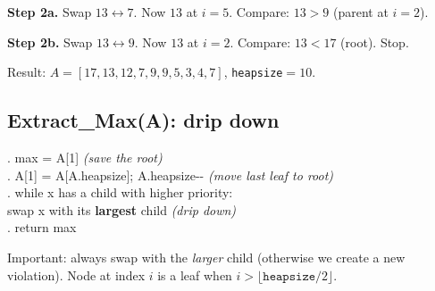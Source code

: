 \documentclass[11pt]{article}
\newcommand{\heapcoords}{\foreach \hi/\hx/\hy in {1/0/4.5,2/-2.3/3.0,3/2.3/3.0,4/-3.45/1.6,5/-1.15/1.6,6/1.15/1.6,7/3.45/1.6,8/-4.0/0.2,9/-2.9/0.2,10/-1.75/0.2}{\coordinate (p\hi) at (\hx,\hy);}}
\newcommand{\drawheap}[2]{%
  \heapcoords
  \begin{scope}[on background layer]\foreach \a/\b in {#2}{\draw[hedge] (p\a)--(p\b);}\end{scope}
  \foreach \idx/\val/\col in {#1}{%
     \node[hnode,text=\col] (n\idx) at (p\idx) {\val};
     \node[hidx] at ([shift={(-0.30,0.30)}]p\idx) {\idx};}
}
\begin{document}
\textbf{Step 2a.} Swap $13 \leftrightarrow 7$. Now $13$ at $i=5$. Compare: $13 > 9$ (parent at $i=2$).

\begin{center}
\end{center}

\textbf{Step 2b.} Swap $13 \leftrightarrow 9$. Now $13$ at $i=2$. Compare: $13 < 17$ (root). Stop.

\begin{center}
\end{center}

Result: $A = [17,13,12,7,9,9,5,3,4,7]$, \texttt{heapsize}$=10$.

\subsection{Extract\_Max(A): drip down}

\begin{codebox}
. max = A[1] \hfill\textnormal{\itshape (save the root)}\\[3pt]
. A[1] = A[A.heapsize]; A.heapsize{-}{-} \hfill\textnormal{\itshape (move last leaf to root)}\\[3pt]
. while x has a child with higher priority:\\
\ttfamily \hspace*{2em}swap x with its \textbf{largest} child \hfill\textnormal{\itshape (drip down)}\\[3pt]
. return max
\end{codebox}

Important: always swap with the \emph{larger} child (otherwise we create a new violation). Node at index $i$ is a leaf when $i > \lfloor \texttt{heapsize}/2 \rfloor$.
\end{document}
